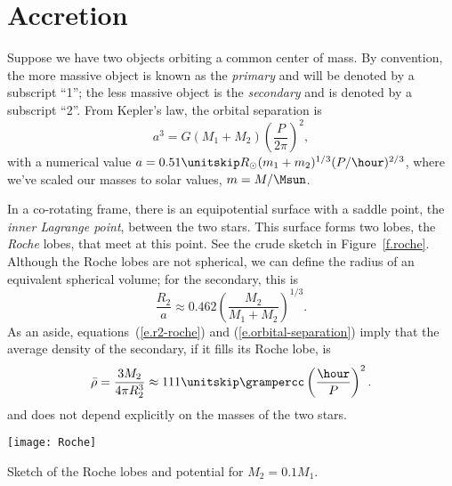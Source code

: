 
\section{Accretion}\label{s.accretion}

Suppose we have two objects orbiting a common center of mass.  By convention, the more massive object is known as the \emph{primary} and will be denoted by a subscript ``1''; the less massive object is the \emph{secondary} and is denoted by a subscript ``2''.  From Kepler's law, the orbital separation is
\begin{equation}\label{e.orbital-separation}
	a^{3} = G(M_{1}+M_{2}) \left(\frac{P}{2\pi}\right)^{2}, 
\end{equation}
with a numerical value $a = 0.51\nsp R_{\sun} (m_{1}+m_{2})^{1/3} (P/\hour)^{2/3}$, where we've scaled our masses to solar values, $m = M/\Msun$.

In a co-rotating frame, there is an equipotential surface with a saddle point, the \emph{inner Lagrange point}, between the two stars.  This surface forms two lobes, the \emph{Roche} lobes, that meet at this point. See the crude sketch in Figure~\ref{f.roche}.
Although the Roche lobes are not spherical, we can define the radius of an equivalent spherical volume; for the secondary, this is
\begin{equation}\label{e.r2-roche}
\frac{R_{2}}{a} \approx 0.462 \left(\frac{M_{2}}{M_{1} + M_{2}}\right)^{1/3}.
\end{equation}
As an aside, equations~(\ref{e.r2-roche}) and (\ref{e.orbital-separation}) imply that the average density of the secondary, if it fills its Roche lobe, is
\[
	\bar{\rho} = \frac{3M_{2}}{4\pi R_{2}^{3}} \approx 111\nsp\grampercc\left(\frac{\hour}{P}\right)^{2}.
\]
and does not depend explicitly on the masses of the two stars.

\begin{marginfigure}[-5\baselineskip]
\texttt{[image: Roche]}
\caption[Schematic of Roche lobes]{\label{f.roche} Sketch of the Roche lobes and potential for $M_{2} = 0.1 M_{1}$.}
\end{marginfigure}

